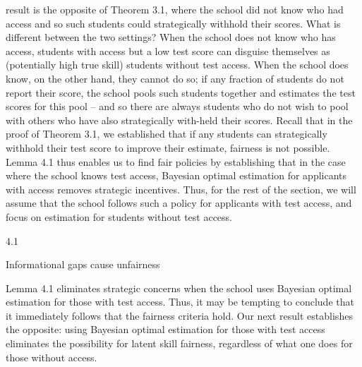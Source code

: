 \documentclass[10pt]{article}
\begin{document}
\begin{ReviewVerbatim}
result is the opposite of Theorem 3.1, where the school did not know who had access and so such
students could strategically withhold their scores.
What is diﬀerent between the two settings? When the school does not know who has access,
students with access but a low test score can disguise themselves as (potentially high true skill)
students without test access. When the school does know, on the other hand, they cannot do so;
if any fraction of students do not report their score, the school pools such students together and
estimates the test scores for this pool – and so there are always students who do not wish to pool
with others who have also strategically with-held their scores.
Recall that in the proof of Theorem 3.1, we established that if any students can strategically
withhold their test score to improve their estimate, fairness is not possible. Lemma 4.1 thus enables
us to ﬁnd fair policies by establishing that in the case where the school knows test access, Bayesian
optimal estimation for applicants with access removes strategic incentives. Thus, for the rest of the
section, we will assume that the school follows such a policy for applicants with test access, and
focus on estimation for students without test access.

4.1

Informational gaps cause unfairness

Lemma 4.1 eliminates strategic concerns when the school uses Bayesian optimal estimation for those
with test access. Thus, it may be tempting to conclude that it immediately follows that the fairness
criteria hold. Our next result establishes the opposite: using Bayesian optimal estimation for those
with test access eliminates the possibility for latent skill fairness, regardless of what one does for
those without access.
\end{ReviewVerbatim}
\end{document}
